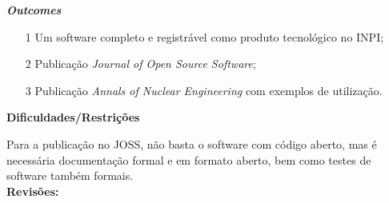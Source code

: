 \textbf{\textit{Outcomes}}

\begin{itemize}
	\item[1] Um software completo e registrável como produto tecnológico no 
INPI;
	\item[2] Publicação \textit{Journal of Open Source Software};
	\item[3] Publicação \textit{Annals of Nuclear Engineering} com exemplos de 
	utilização.
\end{itemize}

\textbf{Dificuldades/Restrições}

Para a publicação no JOSS, não basta o software com código aberto, mas é necessária 
documentação formal e em formato aberto, bem como testes de software também formais.\\

\textbf{Revisões:}
\date{21/11/2018}
